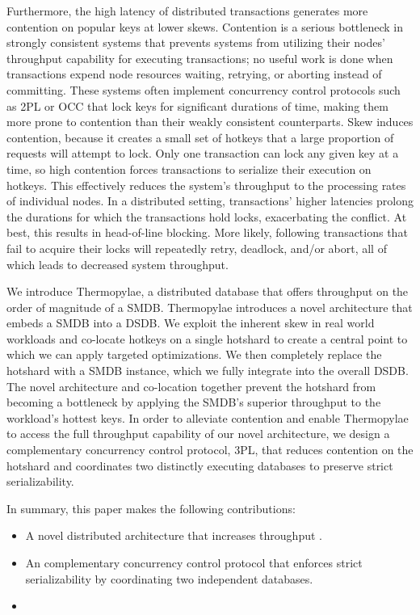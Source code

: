 Furthermore, the high latency of distributed transactions generates more contention on popular keys at lower skews. Contention is a serious bottleneck in strongly consistent systems that prevents systems from utilizing their nodes’ throughput capability for executing transactions; no useful work is done when transactions expend node resources waiting, retrying, or aborting instead of committing. These systems often implement concurrency control protocols such as 2PL or OCC that lock keys for significant durations of time, making them more prone to contention than their weakly consistent counterparts. Skew induces contention, because it creates a small set of hotkeys that a large proportion of requests will attempt to lock. Only one transaction can lock any given key at a time, so high contention forces transactions to serialize their execution on hotkeys. This effectively reduces the system’s throughput to the processing rates of individual nodes. In a distributed setting, transactions’ higher latencies prolong the durations for which the transactions hold locks, exacerbating the conflict. At best, this results in head-of-line blocking. More likely, following transactions that fail to acquire their locks will repeatedly retry, deadlock, and/or abort, all of which leads to decreased system throughput.

We introduce Thermopylae, a distributed database that offers throughput on the order of magnitude of a SMDB. Thermopylae introduces a novel architecture that embeds a SMDB into a DSDB. We exploit the inherent skew in real world workloads and co-locate hotkeys on a single hotshard to create a central point to which we can apply targeted optimizations. We then completely replace the hotshard with a SMDB instance, which we fully integrate into the overall DSDB. The novel architecture and co-location together prevent the hotshard from becoming a bottleneck by applying the SMDB’s superior throughput to the workload’s hottest keys. In order to alleviate contention and enable Thermopylae to access the full throughput capability of our novel architecture, we design a complementary concurrency control protocol, 3PL, that reduces contention on the hotshard and coordinates two distinctly executing databases to preserve strict serializability. 


In summary, this paper makes the following contributions:
\begin{itemize}
    \item A novel distributed architecture that increases throughput .
    \item An complementary concurrency control protocol that enforces strict serializability by coordinating two independent databases.
    \item {}
\end{itemize}